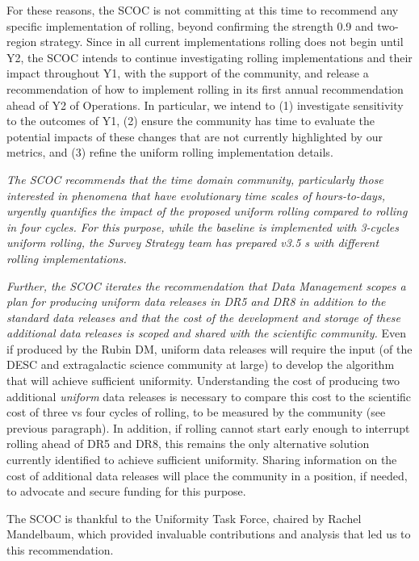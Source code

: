 For these reasons, the SCOC is not committing at this time to recommend any specific implementation of rolling, beyond confirming the strength 0.9 and two-region strategy. Since in all current implementations
rolling does not begin until Y2, the SCOC intends to continue investigating rolling implementations and their impact throughout Y1, with the support of the community, and release a recommendation of how to implement rolling in its first annual recommendation ahead of Y2 of Operations. In particular, we intend to (1) investigate sensitivity to the outcomes of Y1, (2) ensure the community has time to evaluate the potential impacts of these changes that are not currently highlighted by our metrics, and (3) refine the uniform rolling implementation details.

{\it The SCOC recommends that the time domain community, particularly those interested in phenomena that have evolutionary time scales of hours-to-days, urgently quantifies the impact of the proposed uniform rolling compared to rolling in four cycles. For this purpose, while the baseline is implemented with 3-cycles uniform rolling, the Survey Strategy team has prepared v3.5 \opsim s  with different rolling implementations.}

{\it Further, the SCOC iterates the recommendation that Data Management scopes a plan for producing uniform data releases in DR5 and DR8 in addition to the standard data releases and that the cost of the development and storage of these additional data releases is scoped and shared with the scientific community.} Even if produced by the Rubin DM, uniform data releases will require the input (of the DESC and extragalactic science community at large) to develop the algorithm that will achieve sufficient uniformity. Understanding the cost of producing two additional {\it uniform} data releases is necessary to compare this cost to the scientific cost of three vs four cycles of rolling, to be measured by the community (see previous paragraph). In addition, if rolling cannot start early enough to interrupt rolling ahead of DR5 and DR8, this remains the only alternative solution currently identified to achieve sufficient uniformity. Sharing information on the cost of additional data releases will place the community in a position, if needed, to advocate and secure funding for this purpose.

The SCOC is thankful to the Uniformity Task Force, chaired by Rachel Mandelbaum, which provided invaluable contributions and analysis that led us to this recommendation.

